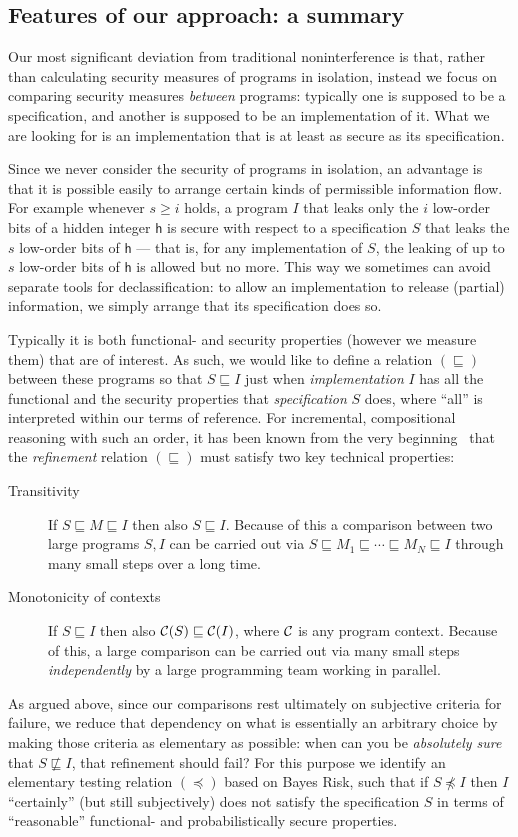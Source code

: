 \documentclass[runningheads]{llncs}
\newcommand\Vh {\mathsf{h}}
\newcommand\CC {{\cal C}}
\newcommand\Ref {\mathrel{\sqsubseteq}}
\newcommand\NotRef {\mathrel{\not\sqsubseteq}}
\newcommand\ERef {\mathrel{\preceq}}
\newcommand\NotERef {\mathrel{\not\preceq}}
\begin{document}
\subsection{Features of our approach: a summary}

Our most significant deviation from traditional noninterference is that, rather than calculating security measures of programs in isolation, instead we focus on comparing security measures \emph{between} programs: typically one is supposed to be a specification, and another is supposed to be an implementation of it. What we are looking for is an implementation that is at least as secure as its specification. 

Since we never consider the security of programs in isolation, an advantage is that it is possible easily to arrange certain kinds of permissible information flow. For example whenever $s{\geq}i$ holds, a program $I$ that leaks only the $i$ low-order bits of a hidden integer $\Vh$ is secure with respect to a specification $S$ that leaks the $s$ low-order bits of $\Vh$ --- that is, for any implementation of $S$, the leaking of up to $s$ low-order bits of $\Vh$ is allowed but no more. This way we sometimes can avoid separate tools for declassification: to allow an implementation to release (partial) information, we simply arrange that its specification does so.

Typically it is both functional- and security properties (however we measure them) that are of interest. As such, we would like to define a relation $(\Ref)$ between these programs so that $S{\Ref}I$ just when \emph{implementation} $I$ has all the functional and the security properties that \emph{specification} $S$ does, where ``all'' is interpreted within our terms of reference. For incremental, compositional reasoning with such an order, it has been known from the very beginning~\cite{Wirth:71} that the \emph{refinement} relation $(\Ref)$ must satisfy two key technical properties:
\begin{description}
\item[Transitivity] If $S{\Ref}M{\Ref}I$ then also $S{\Ref}I$. Because of this a comparison between two large programs $S,I$ can be carried out via $S\Ref M_1\Ref\cdots\Ref M_N\Ref I$ through many small steps over a long time.
\item[Monotonicity of contexts] If $S\Ref I$ then also $\CC(S)\Ref\CC(I)$, where $\CC$ is any program context. Because of this, a large comparison can be carried out via many small steps \emph{independently} by a large programming team working in parallel. 
\end{description}
As argued above, since our comparisons rest ultimately on subjective criteria for failure, we reduce that dependency on what is essentially an arbitrary choice by making those criteria as elementary as possible: when can you be \emph{absolutely sure} that $S{\NotRef}I$, that refinement should fail? For this purpose we identify an elementary testing relation $(\ERef)$ based on Bayes Risk, such that if $S{\NotERef}I$ then $I$ ``certainly'' (but still subjectively) does not satisfy the specification $S$ in terms of ``reasonable'' functional- and probabilistically secure properties. 
\end{document}
